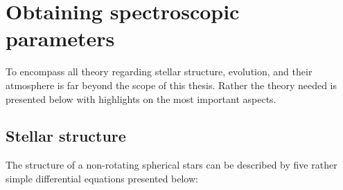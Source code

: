 \chapter{Obtaining spectroscopic parameters}

To encompass all theory regarding stellar structure, evolution, and their
atmosphere is far beyond the scope of this thesis. Rather the theory needed is
presented below with highlights on the most important aspects.

\section{Stellar structure}

The structure of a non-rotating spherical stars can be described by five rather
simple differential equations \citep[see e.g.][]{kippenhahn} presented below:
